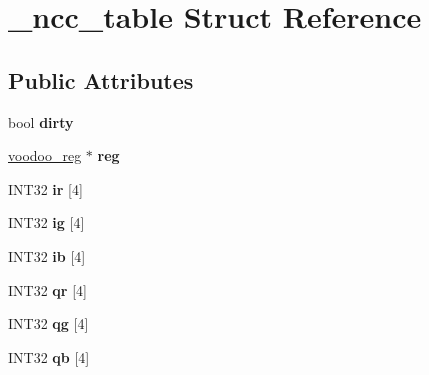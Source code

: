\hypertarget{struct__ncc__table}{\section{\-\_\-ncc\-\_\-table Struct Reference}
\label{struct__ncc__table}
}
\subsection*{Public Attributes}
\begin{DoxyCompactItemize}
\item 
\hypertarget{struct__ncc__table_a5bc2ad57271aad7ccd0448f3e9693b99}{bool {\bfseries dirty}}\label{struct__ncc__table_a5bc2ad57271aad7ccd0448f3e9693b99}

\item 
\hypertarget{struct__ncc__table_a445f947bdff8a0631ccbdcaf5e08457e}{\hyperlink{union__voodoo__reg}{voodoo\-\_\-reg} $\ast$ {\bfseries reg}}\label{struct__ncc__table_a445f947bdff8a0631ccbdcaf5e08457e}

\item 
\hypertarget{struct__ncc__table_a0e34bc2db5172865c9a512ec6d625335}{I\-N\-T32 {\bfseries ir} \mbox{[}4\mbox{]}}\label{struct__ncc__table_a0e34bc2db5172865c9a512ec6d625335}

\item 
\hypertarget{struct__ncc__table_ac5ecd4e0cf19cb167c53516cc809ebc1}{I\-N\-T32 {\bfseries ig} \mbox{[}4\mbox{]}}\label{struct__ncc__table_ac5ecd4e0cf19cb167c53516cc809ebc1}

\item 
\hypertarget{struct__ncc__table_aed726ffbb7f1b379a4f85f548fedeb7e}{I\-N\-T32 {\bfseries ib} \mbox{[}4\mbox{]}}\label{struct__ncc__table_aed726ffbb7f1b379a4f85f548fedeb7e}

\item 
\hypertarget{struct__ncc__table_afd1ba88293fcd14013dad692537e1c68}{I\-N\-T32 {\bfseries qr} \mbox{[}4\mbox{]}}\label{struct__ncc__table_afd1ba88293fcd14013dad692537e1c68}

\item 
\hypertarget{struct__ncc__table_a28e1a35fcd9297b9740c09dad56f52f0}{I\-N\-T32 {\bfseries qg} \mbox{[}4\mbox{]}}\label{struct__ncc__table_a28e1a35fcd9297b9740c09dad56f52f0}

\item 
\hypertarget{struct__ncc__table_a93f92b8a736e19e49b1ead006fbecdf2}{I\-N\-T32 {\bfseries qb} \mbox{[}4\mbox{]}}\label{struct__ncc__table_a93f92b8a736e19e49b1ead006fbecdf2}


\end{DoxyCompactItemize}
